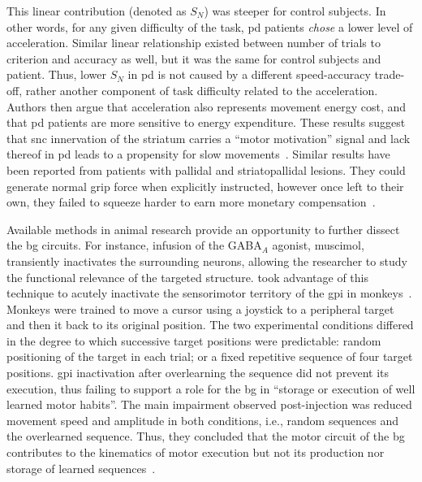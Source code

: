 This linear contribution (denoted as $S_N$) was steeper for control subjects.
In other words, for any given difficulty of the task, \gls{pd} patients \textit{chose} a lower level of acceleration.
Similar linear relationship existed between number of trials to criterion and accuracy as well, but it was the same for control subjects and patient.
Thus, lower $S_N$ in \gls{pd} is not caused by a different speed-accuracy trade-off, rather another component of task difficulty related to the acceleration.
Authors then argue that acceleration also represents movement energy cost, and that \gls{pd} patients are more sensitive to energy expenditure.
These results suggest that \gls{snc} innervation of the striatum carries a ``motor motivation'' signal and lack thereof in \gls{pd} leads to a propensity for slow movements~\cite{Mazzoni2007}.
Similar results have been reported from patients with pallidal and striatopallidal lesions.
They could generate normal grip force when explicitly instructed, however once left to their own, they failed to squeeze harder to earn more monetary compensation~\cite{Schmidt2008Brain}.
\par
Available methods in animal research provide an opportunity to further dissect the \gls{bg} circuits.
For instance, infusion of the GABA$_A$ agonist, muscimol, transiently inactivates the surrounding neurons, allowing the researcher to study the functional relevance of the targeted structure.\footnotemark
{} took advantage of this technique to acutely inactivate the sensorimotor territory of the \gls{gpi} in monkeys~\cite{Desmurget2010JNeurosci}.
Monkeys were trained to move a cursor using a joystick to a peripheral target and then it back to its original position.
The two experimental conditions differed in the degree to which successive target positions were predictable:
    random positioning of the target in each trial;
    or a fixed repetitive sequence of four target positions.
\Gls{gpi} inactivation after overlearning the sequence did not prevent its execution, thus failing to support a role for the \gls{bg} in ``storage or execution of well learned motor habits''.
The main impairment observed post-injection was reduced movement speed and amplitude in both conditions, i.e., random sequences and the overlearned sequence.
Thus, they concluded that the motor circuit of the \gls{bg} contributes to the kinematics of motor execution but not its production nor storage of learned sequences~\cite{Desmurget2010JNeurosci}.
